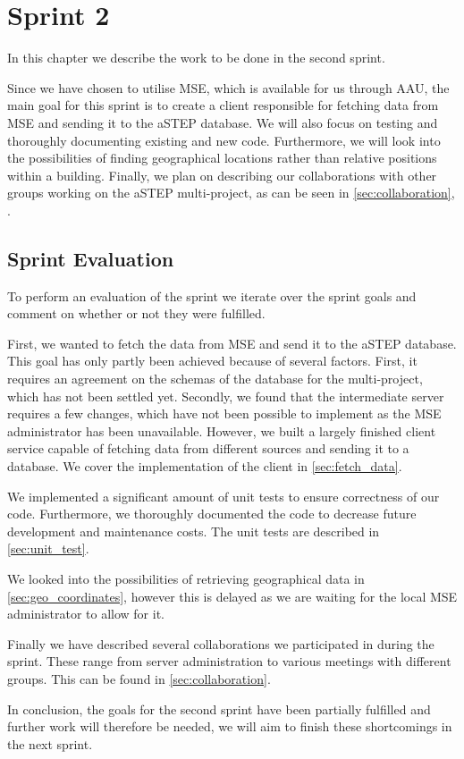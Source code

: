 \chapter{Sprint 2} \label{cha:sprint2}
In this chapter we describe the work to be done in the second sprint. 

Since we have chosen to utilise MSE, which is available for us through AAU, the main goal for this sprint is to create a client responsible for fetching data from MSE and sending it to the aSTEP database. We will also focus on testing and thoroughly documenting existing and new code. Furthermore, we will look into the possibilities of finding geographical locations rather than relative positions within a building. Finally, we plan on describing our collaborations with other groups working on the aSTEP multi-project, as can be seen in \cref{sec:collaboration}, .





\section{Sprint Evaluation}\label{sec:s2_eval}
To perform an evaluation of the sprint we iterate over the sprint goals and comment on whether or not they were fulfilled.

First, we wanted to fetch the data from MSE and send it to the aSTEP database. This goal has only partly been achieved because of several factors. First, it requires an agreement on the schemas of the database for the multi-project, which has not been settled yet. Secondly, we found that the intermediate server requires a few changes, which have not been possible to implement as the MSE administrator has been unavailable. However, we built a largely finished client service capable of fetching data from different sources and sending it to a database. We cover the implementation of the client in \cref{sec:fetch_data}.

We implemented a significant amount of unit tests to ensure correctness of our code. Furthermore, we thoroughly documented the code to decrease future development and maintenance costs. The unit tests are described in \cref{sec:unit_test}.

We looked into the possibilities of retrieving geographical data in \cref{sec:geo_coordinates}, however this is delayed as we are waiting for the local MSE administrator to allow for it.

Finally we have described several collaborations we participated in during the sprint. These range from server administration to various meetings with different groups. This can be found in \cref{sec:collaboration}. 

In conclusion, the goals for the second sprint have been partially fulfilled and further work will therefore be needed, we will aim to finish these shortcomings in the next sprint.